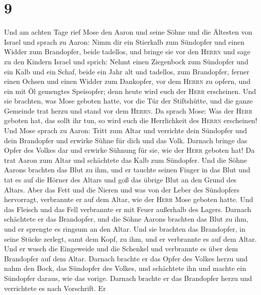 \hypertarget{section-8}{%
\section{9}\label{section-8}}

 Und am achten Tage rief Mose den Aaron und seine Söhne
und die Ältesten von Israel und sprach zu Aaron:  Nimm dir
ein Stierkalb zum Sündopfer und einen Widder zum Brandopfer, beide
tadellos, und bringe sie vor den \textsc{Herrn}  und sage
zu den Kindern Israel und sprich: Nehmt einen Ziegenbock zum Sündopfer
und ein Kalb und ein Schaf, beide ein Jahr alt und tadellos, zum
Brandopfer,  ferner einen Ochsen und einen Widder zum
Dankopfer, vor dem \textsc{Herrn} zu opfern, und ein mit Öl gemengtes
Speisopfer; denn heute wird euch der \textsc{Herr} erscheinen.
 Und sie brachten, was Mose geboten hatte, vor die Tür der
Stiftshütte, und die ganze Gemeinde trat herzu und stand vor dem
\textsc{Herrn}.  Da sprach Mose: Was der \textsc{Herr}
geboten hat, das sollt ihr tun, so wird euch die Herrlichkeit des
\textsc{Herrn} erscheinen!  Und Mose sprach zu Aaron:
Tritt zum Altar und verrichte dein Sündopfer und dein Brandopfer und
erwirke Sühne für dich und das Volk. Darnach bringe das Opfer des Volkes
dar und erwirke Sühnung für sie, wie der \textsc{Herr} geboten hat!
 Da trat Aaron zum Altar und schächtete das Kalb zum
Sündopfer.  Und die Söhne Aarons brachten das Blut zu ihm,
und er tauchte seinen Finger in das Blut und tat es auf die Hörner des
Altars und goß das übrige Blut an den Grund des Altars. 
Aber das Fett und die Nieren und was von der Leber des Sündopfers
hervorragt, verbrannte er auf dem Altar, wie der \textsc{Herr} Mose
geboten hatte.  Und das Fleisch und das Fell verbrannte
er mit Feuer außerhalb des Lagers.  Darnach schächtete er
das Brandopfer, und die Söhne Aarons brachten das Blut zu ihm, und er
sprengte es ringsum an den Altar.  Und sie brachten das
Brandopfer, in seine Stücke zerlegt, samt dem Kopf, zu ihm, und er
verbrannte es auf dem Altar.  Und er wusch die Eingeweide
und die Schenkel und verbrannte es über dem Brandopfer auf dem Altar.
 Darnach brachte er das Opfer des Volkes herzu und nahm
den Bock, das Sündopfer des Volkes, und schächtete ihn und machte ein
Sündopfer daraus, wie das vorige.  Darnach brachte er das
Brandopfer herzu und verrichtete es nach Vorschrift.  Er
